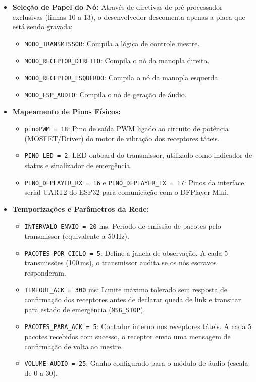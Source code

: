 \documentclass[12pt,a4paper]{article}
\begin{document}
\begin{itemize}
    \item \textbf{Seleção de Papel do Nó:} Através de diretivas de pré-processador exclusivas (linhas 10 a 13), o desenvolvedor descomenta apenas a placa que está sendo gravada:
    \begin{itemize}
        \item \texttt{MODO\_TRANSMISSOR}: Compila a lógica de controle mestre.
        \item \texttt{MODO\_RECEPTOR\_DIREITO}: Compila o nó da manopla direita.
        \item \texttt{MODO\_RECEPTOR\_ESQUERDO}: Compila o nó da manopla esquerda.
        \item \texttt{MODO\_ESP\_AUDIO}: Compila o nó de geração de áudio.
    \end{itemize}
    \item \textbf{Mapeamento de Pinos Físicos:}
    \begin{itemize}
        \item \texttt{pinoPWM = 18}: Pino de saída PWM ligado ao circuito de potência (MOSFET/Driver) do motor de vibração dos receptores táteis.
        \item \texttt{PINO\_LED = 2}: LED onboard do transmissor, utilizado como indicador de status e sinalizador de emergência.
        \item \texttt{PINO\_DFPLAYER\_RX = 16} e \texttt{PINO\_DFPLAYER\_TX = 17}: Pinos da interface serial UART2 do ESP32 para comunicação com o DFPlayer Mini.
    \end{itemize}
    \item \textbf{Temporizações e Parâmetros da Rede:}
    \begin{itemize}
        \item \texttt{INTERVALO\_ENVIO = 20} ms: Período de emissão de pacotes pelo transmissor (equivalente a 50\,Hz).
        \item \texttt{PACOTES\_POR\_CICLO = 5}: Define a janela de observação. A cada 5 transmissões (100\,ms), o transmissor audita se os nós escravos responderam.
        \item \texttt{TIMEOUT\_ACK = 300} ms: Limite máximo tolerado sem resposta de confirmação dos receptores antes de declarar queda de link e transitar para estado de emergência (\texttt{MSG\_STOP}).
        \item \texttt{PACOTES\_PARA\_ACK = 5}: Contador interno nos receptores táteis. A cada 5 pacotes recebidos com sucesso, o receptor envia uma mensagem de confirmação de volta ao mestre.
        \item \texttt{VOLUME\_AUDIO = 25}: Ganho configurado para o módulo de áudio (escala de 0 a 30).
    \end{itemize}
\end{itemize}
\end{document}
